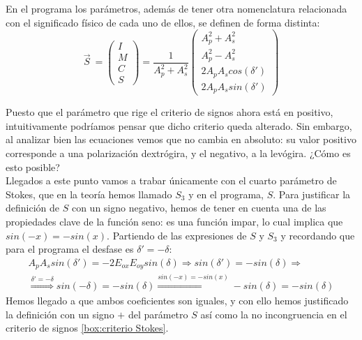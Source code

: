 \documentclass[11pt]{article}
\begin{document}
    \noindent En el programa los parámetros, además de tener otra nomenclatura relacionada con el significado físico de cada uno de ellos, se definen de forma distinta:
    \begin{equation}
    {\displaystyle {\vec {S}}\ ={\begin{pmatrix}I\\M\\C\\S\end{pmatrix}}={\frac{1}{A_{p}^2+A_{s}^2}\begin{pmatrix}A_{p}^2+A_{s}^2\\A_{p}^2-A_{s}^2\\2A_{p}A_{s}cos(\delta ')\\2A_{p}A_{s}sin(\delta ')\end{pmatrix}}}
    \end{equation} \label{eq:stokes programa}
    
    \noindent Puesto que el parámetro que rige el criterio de signos ahora está en positivo, intuitivamente podríamos pensar que dicho criterio queda alterado. Sin embargo, al analizar bien las ecuaciones vemos que no cambia en absoluto: su valor positivo corresponde a una polarización dextrógira, y el negativo, a la levógira. ¿Cómo es esto posible? \\

    \noindent Llegados a este punto vamos a trabar únicamente con el cuarto parámetro de Stokes, que en la teoría hemos llamado $S_3$ y en el programa, $S$. Para justificar la definición de $S$ con un signo negativo, hemos de tener en cuenta una de las propiedades clave de la función seno: es una función impar, lo cual implica que $sin(-x) = -sin(x)$. Partiendo de las expresiones de $S$ y $S_3$ y recordando que para el programa el desfase es $\delta ' = - \delta$:
    \begin{equation}
    \begin{split}
        A_{p}A_{s}sin(\delta ') = -2E_{ox}E_{oy}sin(\delta) \Longrightarrow sin(\delta ') = -sin(\delta) \Longrightarrow \\ \stackrel{\delta ' = - \delta}{\Longrightarrow} sin(-\delta) = -sin(\delta) \stackrel{sin(-x) = -sin(x)}{\Longrightarrow} -sin(\delta) = -sin(\delta)
    \end{split}
    \end{equation}
    \noindent Hemos llegado a que ambos coeficientes son iguales, y con ello hemos justificado la definición con un signo $+$ del parámetro $S$ así como la no incongruencia en el criterio de signos \ref{box:criterio Stokes}.
\end{document}
